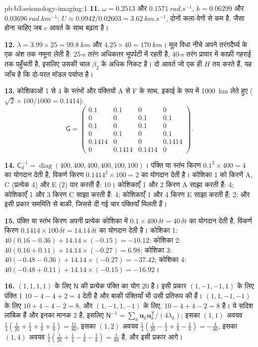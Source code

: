 \begin{solution}{pb:b3:seismology-imaging:1}
\textbf{11.} $\omega = 0.2513$ और $\qty{0.1571}{rad.s^{-1}}$, $k = 0.06299$ और
$\qty{0.03696}{rad.km^{-1}}$: $U \approx 0.0942/0.02603 = \qty{3.62}{km.s^{-1}}$,
दोनों कला-वेगों से कम है, जैसा होना चाहिए जब $c$ आवर्त के साथ
बढ़ता है।

\textbf{12.} $\lambda = 3.99\times25 = \qty{99.8}{km}$ और $4.25\times40 =
\qty{170}{km}$। मूल विधा नीचे अपने तरंगदैर्घ्य के एक अंश तक नमूना लेती है:
25-s तरंग अधिकतर भूपर्पटी में रहती है, 40-s तरंग प्रावार में काफ़ी गहराई तक पहुँचती है,
इसलिए उसकी चाल $\beta_2$ के अधिक निकट है। दो आवर्त जो एक ही $H$ तय करते हैं,
यह जाँच है कि दो-परत मॉडल पर्याप्त है।

\textbf{13.} कोशिकाओं 1 से 4 के स्तंभों और पंक्तियों A से F के साथ, इकाई के रूप में
\qty{1000}{km} लेते हुए ($\sqrt2\times100/1000 = 0.1414$):
\[
  \mathsf G = \begin{pmatrix}
  0.1 & 0.1 & 0 & 0 \\ 0 & 0 & 0.1 & 0.1 \\ 0.1 & 0 & 0.1 & 0 \\
  0 & 0.1 & 0 & 0.1 \\ 0.1414 & 0 & 0 & 0.1414 \\ 0 & 0.1414 & 0.1414 & 0
  \end{pmatrix}.
\]

\textbf{14.} $\mathsf C_d^{-1} = \operatorname{diag}(400, 400, 400, 400, 100,
100)$। पंक्ति या स्तंभ किरण $0.1^2\times400 = 4$ का योगदान देती है, विकर्ण किरण
$0.1414^2\times100 = 2$ का योगदान देती है। कोशिका 1 को किरणें A, C (प्रत्येक 4) और E (2) पार करती हैं: 10। कोशिकाएँ
1 और 2 किरण A साझा करती हैं: 4; कोशिकाएँ 1 और 3 किरण C साझा करती हैं: 4; कोशिकाएँ 1 और 4 किरण E साझा करती हैं: 2; और
इसी प्रकार सममिति से बाकी, जिससे दी गई चार पंक्तियाँ मिलती हैं।

\textbf{15.} पंक्ति या स्तंभ किरण अपनी प्रत्येक कोशिका में $0.1\times400\,\delta t = 40\,
\delta t$ का योगदान देती है, विकर्ण किरण $0.1414\times100\,\delta t =
14.14\,\delta t$ का योगदान देती है। कोशिका 1: $40(0.16 - 0.36) + 14.14\times(-0.15) = -10.12$; कोशिका
2: $40(0.16 + 0.11) + 14.14\times(-0.27) = 6.98$; कोशिका 3: $40(-0.48 - 0.36) +
14.14\times(-0.27) = -37.42$; कोशिका 4: $40(-0.48 + 0.11) + 14.14\times(-0.15) =
-16.92$।

\textbf{16.} $(1,1,1,1)$ के लिए $\mathsf N$ की प्रत्येक पंक्ति का योग 20 है। इसी प्रकार
$(1,-1,-1,1)$ के लिए पंक्ति 1 $10 - 4 - 4 + 2 = 4$ देती है और बाकी पंक्तियाँ भी
उसी प्रतिरूप की हैं। $(1,1,-1,-1)$ के लिए $10 + 4 - 4 - 2 = 8$, और $(1,-1,1,-1)$ के लिए,
$10 - 4 + 4 - 2 = 8$ है। ये सदिश लांबिक हैं और इनका मानक 2 है, इसलिए
$\mathsf N^{-1} = \sum_k \mathbf u_k\mathbf u_k^{\mathsf T}/(4\lambda_k)$; इसका
$(1,1)$ अवयव $\tfrac14(\tfrac1{20} + \tfrac14 + \tfrac18 + \tfrac18) =
\tfrac{11}{80}$, इसका $(1,2)$ अवयव $\tfrac14(\tfrac1{20} - \tfrac14 + \tfrac18
- \tfrac18) = -\tfrac4{80}$, इसका $(1,4)$ अवयव $\tfrac14(\tfrac1{20} +
\tfrac14 - \tfrac18 - \tfrac18) = \tfrac1{80}$ है, और इसी प्रकार आगे।


\end{solution}
